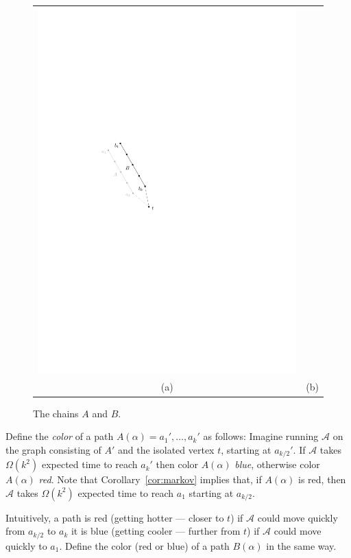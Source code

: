 \documentclass [letterpaper] {patmorin}
\begin{document}
\begin{figure}
\begin{center}
\begin{tabular}{cc}
      \includegraphics{pics/bchain} \\
      (a) & (b)
    \end{tabular}
  \end{center}
  \caption{The chains $A$ and $B$.}
  \label{fig:ab}
\end{figure}

Define the \emph{color} of a path $A(\alpha)=a_1',\ldots,a_k'$ as
follows: Imagine running $\mathcal{A}$ on the graph consisting of $A'$
and the isolated vertex $t$, starting at $a_{k/2}'$.  If $\mathcal{A}$
takes $\Omega (k^{2})$ expected time to reach $a_k'$ then color
$A(\alpha)$ \emph{blue}, otherwise color $A(\alpha)$ \emph{red}.
Note that Corollary~\ref{cor:markov} implies that, if $A(\alpha)$ is red,
then $\mathcal{A}$ takes $\Omega(k^2)$ expected time to reach $a_1$
starting at $a_{k/2}$.

Intuitively, a path is red (getting hotter --- closer to $t$) if $\mathcal{A}$ could move quickly from $a_{k/2}$ to $a_k$ it is blue (getting cooler --- further from $t$) if $\mathcal{A}$ could move quickly to $a_1$.  Define the color (red or blue) of a path $B(\alpha)$ in the same way.
\end{document}
